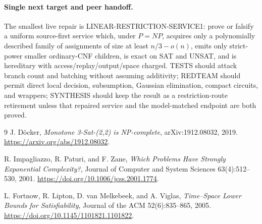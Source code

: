 \documentclass[11pt]{article}
\begin{document}
\paragraph{Single next target and peer handoff.}
The smallest live repair is \textsf{LINEAR-RESTRICTION-SERVICE1}: prove or
falsify a uniform source-first service which, under $P=NP$, acquires only a
polynomially described family of assignments of size at least
$n/3-o(n)$, emits only strict-power smaller ordinary-CNF children, is exact
on SAT and UNSAT, and is hereditary with access/replay/output/space charged.
TESTS should attack branch count and batching without assuming additivity;
REDTEAM should permit direct local decision, subsumption, Gaussian
elimination, compact circuits, and wrappers; SYNTHESIS should keep the result
as a restriction-route retirement unless that repaired service and the
model-matched endpoint are both proved.

\begin{thebibliography}{9}
J. D\"ocker, \emph{Monotone 3-Sat-(2,2) is NP-complete},
arXiv:1912.08032, 2019.
\url{https://arxiv.org/abs/1912.08032}.

R. Impagliazzo, R. Paturi, and F. Zane,
\emph{Which Problems Have Strongly Exponential Complexity?},
Journal of Computer and System Sciences 63(4):512--530, 2001.
\url{https://doi.org/10.1006/jcss.2001.1774}.

L. Fortnow, R. Lipton, D. van Melkebeek, and A. Viglas,
\emph{Time--Space Lower Bounds for Satisfiability},
Journal of the ACM 52(6):835--865, 2005.
\url{https://doi.org/10.1145/1101821.1101822}.
\end{thebibliography}

\end{document}
